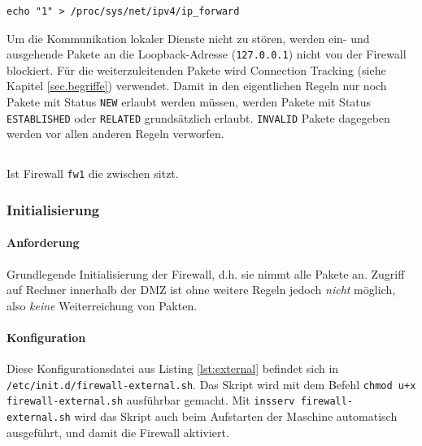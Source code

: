 \begin{verbatim}
echo "1" > /proc/sys/net/ipv4/ip_forward
\end{verbatim}

\noindent Um die Kommunikation lokaler Dienste nicht zu stören, werden ein-
und ausgehende Pakete an die Loopback-Adresse ({\tt 127.0.0.1}) nicht von der
Firewall blockiert.
Für die weiterzuleitenden Pakete wird Connection Tracking
(siehe Kapitel \ref{sec.begriffe}) verwendet.
Damit in den eigentlichen Regeln nur noch Pakete mit Status {\tt NEW} erlaubt
werden müssen, werden Pakete mit Status {\tt ESTABLISHED} oder {\tt RELATED}
grundsätzlich erlaubt.
{\tt INVALID} Pakete dagegeben werden vor allen anderen Regeln verworfen.




\subsection{\fwa}

Ist Firewall {\tt fw1} die zwischen \fwa sitzt.


\subsubsection{Initialisierung}

\paragraph{Anforderung} Grundlegende Initialisierung der Firewall, d.h.
sie nimmt alle Pakete an. Zugriff auf Rechner innerhalb der DMZ ist ohne
weitere Regeln jedoch \emph{nicht} möglich, also \emph{keine} Weiterreichung von
Pakten.

\paragraph{Konfiguration} Diese Konfigurationsdatei aus Listing \ref{lst:external}
befindet sich in {\tt /etc/init.d/firewall-external.sh}.
Das Skript wird mit dem Befehl {\tt chmod u+x firewall-external.sh}
ausführbar gemacht. Mit {\tt insserv firewall-external.sh}
wird das Skript auch beim Aufstarten der Maschine automatisch ausgeführt,
und damit die Firewall aktiviert.



